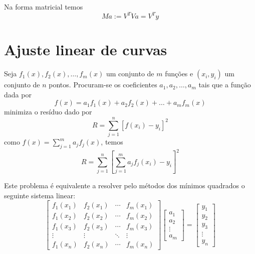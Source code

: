 Na forma matricial temos 
\begin{equation}
   Ma := V^TV a = V^Ty
\end{equation}




\section{Ajuste linear de curvas}
Seja $f_1(x), f_2(x),\ldots, f_m(x)$ um conjunto de $m$ funções e $(x_i,y_i)$ um conjunto de $n$ pontos. Procuram-se os coeficientes $a_1,a_2,\ldots, a_m$ tais que a função dada por
$$f(x)=a_1f_1(x)+a_2f_2(x)+\ldots+a_mf_m(x)$$
minimiza o resíduo dado por
$$R= \sum_{j=1}^n \left[f(x_i)-y_i\right]^2$$
como $f(x)=\sum_{j=1}^m a_jf_j(x)$, temos
$$R= \sum_{j=1}^n \left[\sum_{j=1}^m a_jf_j(x_i)-y_i\right]^2$$

Este problema é equivalente a resolver pelo métodos dos mínimos quadrados o seguinte sistema linear:
$$
\left[
\begin{array}{cccc}
f_1(x_1)&f_2(x_1) & \cdots & f_m(x_1)\\
f_1(x_2)&f_2(x_2) & \cdots & f_m(x_2)\\
f_1(x_3)&f_2(x_3) & \cdots & f_m(x_3)\\
\vdots & \vdots & \ddots & \vdots\\
f_1(x_n)&f_2(x_n) & \cdots & f_m(x_n)
\end{array}
\right]
\left[
\begin{array}{c}
a_1\\
a_2\\
\vdots\\
a_m
\end{array}
\right]=\left[\begin{array}{c}
y_1\\
y_2\\
y_3\\
\vdots\\
y_n
\end{array}
\right]
$$



